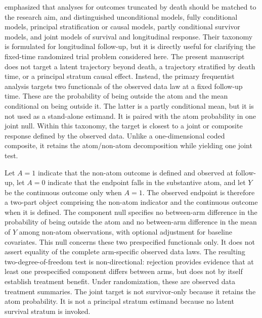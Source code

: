 \documentclass[11pt]{article}
\begin{document}
\citet{Kurland_2009} emphasized that analyses for outcomes truncated by death should be matched to the research aim, and distinguished unconditional models, fully conditional models, principal stratification or causal models, partly conditional survivor models, and joint models of survival and longitudinal response. Their taxonomy is formulated for longitudinal follow-up, but it is directly useful for clarifying the fixed-time randomized trial problem considered here. The present manuscript does not target a latent trajectory beyond death, a trajectory stratified by death time, or a principal stratum causal effect. Instead, the primary frequentist analysis targets two functionals of the observed data law at a fixed follow-up time. These are the probability of being outside the atom and the mean conditional on being outside it. The latter is a partly conditional mean, but it is not used as a stand-alone estimand. It is paired with the atom probability in one joint null. Within this taxonomy, the target is closest to a joint or composite response defined by the observed data. Unlike a one-dimensional coded composite, it retains the atom/non-atom decomposition while yielding one joint test.

Let $A=1$ indicate that the non-atom outcome is defined and observed at follow-up, let $A=0$ indicate that the endpoint falls in the substantive atom, and let $Y$ be the continuous outcome only when $A=1$. The observed endpoint is therefore a two-part object comprising the non-atom indicator and the continuous outcome when it is defined. The component null specifies no between-arm difference in the probability of being outside the atom and no between-arm difference in the mean of $Y$ among non-atom observations, with optional adjustment for baseline covariates. This null concerns these two prespecified functionals only. It does not assert equality of the complete arm-specific observed data laws. The resulting two-degree-of-freedom test is non-directional: rejection provides evidence that at least one prespecified component differs between arms, but does not by itself establish treatment benefit. Under randomization, these are observed data treatment summaries. The joint target is not survivor-only because it retains the atom probability. It is not a principal stratum estimand because no latent survival stratum is invoked.
\end{document}

